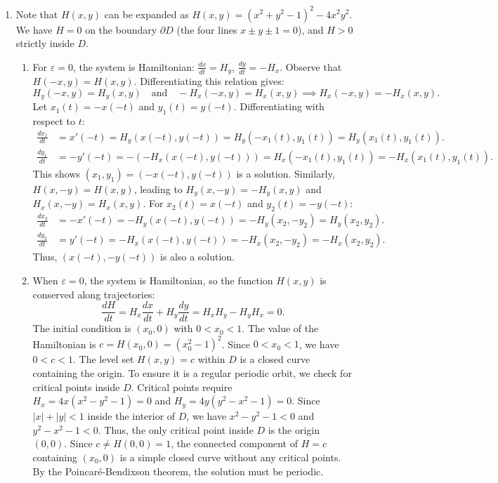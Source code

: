 \documentclass{article}
\begin{document}
\begin{enumerate}[label=\fbox{\arabic*}]
  \item %
        Note that $H(x, y)$ can be expanded as $H(x, y) = (x^2+y^2-1)^2 - 4x^2y^2$. 
        We have $H=0$ on the boundary $\partial D$ (the four lines $x \pm y \pm 1 = 0$), and $H > 0$ strictly inside $D$.
        \begin{enumerate}[label=(\arabic*)]
          \item For $\varepsilon = 0$, the system is Hamiltonian: $\frac{dx}{dt} = H_y$, $\frac{dy}{dt} = -H_x$.
          Observe that $H(-x, y) = H(x, y)$. Differentiating this relation gives:
          \[
            H_y(-x, y) = H_y(x, y) \quad \text{and} \quad -H_x(-x, y) = H_x(x, y) \implies H_x(-x, y) = -H_x(x, y).
          \]
          Let $x_1(t) = -x(-t)$ and $y_1(t) = y(-t)$. Differentiating with respect to $t$:
          \begin{align*}
            \frac{dx_1}{dt} &= x'(-t) = H_y(x(-t), y(-t)) = H_y(-x_1(t), y_1(t)) = H_y(x_1(t), y_1(t)). \\
            \frac{dy_1}{dt} &= -y'(-t) = -(-H_x(x(-t), y(-t))) = H_x(-x_1(t), y_1(t)) = -H_x(x_1(t), y_1(t)).
          \end{align*}
          This shows $(x_1, y_1) = (-x(-t), y(-t))$ is a solution.
          Similarly, $H(x, -y) = H(x, y)$, leading to $H_y(x, -y) = -H_y(x, y)$ and $H_x(x, -y) = H_x(x, y)$.
          For $x_2(t) = x(-t)$ and $y_2(t) = -y(-t)$:
          \begin{align*}
            \frac{dx_2}{dt} &= -x'(-t) = -H_y(x(-t), y(-t)) = -H_y(x_2, -y_2) = H_y(x_2, y_2). \\
            \frac{dy_2}{dt} &= y'(-t) = -H_x(x(-t), y(-t)) = -H_x(x_2, -y_2) = -H_x(x_2, y_2).
          \end{align*}
          Thus, $(x(-t), -y(-t))$ is also a solution.

          \item When $\varepsilon = 0$, the system is Hamiltonian, so the function $H(x, y)$ is conserved along trajectories:
          \[
            \frac{dH}{dt} = H_x \frac{dx}{dt} + H_y \frac{dy}{dt} = H_x H_y - H_y H_x = 0.
          \]
          The initial condition is $(x_0, 0)$ with $0 < x_0 < 1$. The value of the Hamiltonian is $c = H(x_0, 0) = (x_0^2-1)^2$. Since $0 < x_0 < 1$, we have $0 < c < 1$.
          The level set $H(x, y) = c$ within $D$ is a closed curve containing the origin. 
          To ensure it is a regular periodic orbit, we check for critical points inside $D$.
          Critical points require $H_x = 4x(x^2-y^2-1) = 0$ and $H_y = 4y(y^2-x^2-1) = 0$.
          Since $|x| + |y| < 1$ inside the interior of $D$, we have $x^2 - y^2 - 1 < 0$ and $y^2 - x^2 - 1 < 0$.
          Thus, the only critical point inside $D$ is the origin $(0, 0)$. 
          Since $c \neq H(0, 0) = 1$, the connected component of $H=c$ containing $(x_0, 0)$ is a simple closed curve without any critical points. By the Poincaré-Bendixson theorem, the solution must be periodic.


\end{enumerate}
\end{enumerate}
\end{document}
